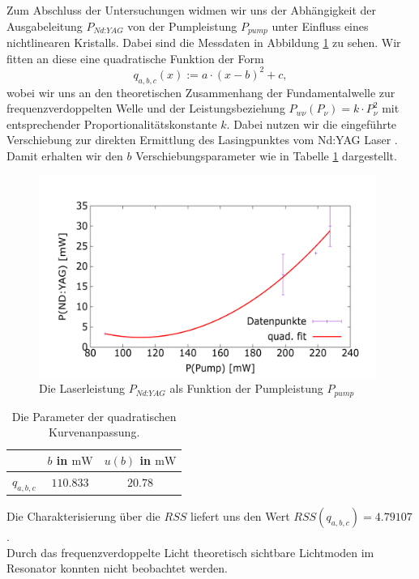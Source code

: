 \documentclass[../../main.tex]{subfiles}
\begin{document}
    Zum Abschluss der Untersuchungen widmen wir uns der Abhängigkeit der Ausgabeleitung $P_{\textit{Nd:YAG}}$ von der Pumpleistung $P_{\textit{pump}}$ unter Einfluss eines nichtlinearen Kristalls. Dabei sind die Messdaten in Abbildung \ref{fig:PumpLaserLeistung} zu sehen. Wir fitten an diese eine quadratische Funktion der Form
    \[
        q_{a,b,c}(x) := a\cdot (x - b)^2 + c,
    \]
    wobei wir uns an den theoretischen Zusammenhang der Fundamentalwelle zur frequenzverdoppelten Welle und der Leistungsbeziehung $P_{w\nu}(P_\nu) = k\cdot P_\nu^2$ mit entsprechender Proportionalitätskonstante $k$. Dabei nutzen wir die eingeführte Verschiebung zur direkten Ermittlung des Lasingpunktes vom Nd:YAG Laser \cite[p. 19]{doc:experiment08}. Damit erhalten wir den $b$ Verschiebungsparameter wie in Tabelle \ref{tab:PumpLaserLeistungFitParameter} dargestellt.
    \begin{figure}[H]
        \centering
        \includegraphics[width=11cm]{../../Bilddateien/7-2/P(NDYAG)overP(Pump).png}
        \caption{Die Laserleistung $P_{\textit{Nd:YAG}}$ als Funktion der Pumpleistung $P_{\textit{pump}}$}
        \label{fig:PumpLaserLeistung}
    \end{figure}
    \begin{table}[H]
        \centering
        \begin{tabular}{c|cc}
            \hline
             & $b$ in $\si{\mW}$ & $u(b)$ in $\si{\mW}$ \\
            \hline\hline
            $q_{a, b, c}$ & $110.833$ & $20.78$
        \end{tabular}
        \caption{Die Parameter der quadratischen Kurvenanpassung.}
        \label{tab:PumpLaserLeistungFitParameter}
    \end{table}
    Die Charakterisierung über die $RSS$ liefert uns den Wert $RSS(q_{a,b,c}) = 4.79107$.\\

    Durch das frequenzverdoppelte Licht theoretisch sichtbare Lichtmoden im Resonator konnten nicht beobachtet werden.
\end{document}
